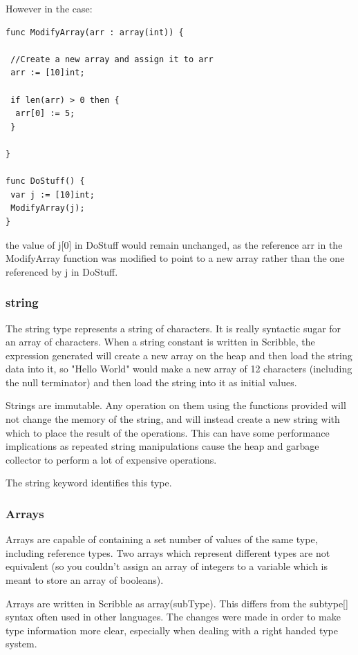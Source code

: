 \documentclass[]{final_report}
\begin{document}
However in the case:
\begin{verbatim}
func ModifyArray(arr : array(int)) {

 //Create a new array and assign it to arr
 arr := [10]int;

 if len(arr) > 0 then {
  arr[0] := 5;
 }

}

func DoStuff() {
 var j := [10]int;
 ModifyArray(j);
}
\end{verbatim}
the value of j[0] in DoStuff would remain unchanged, as the reference arr in the ModifyArray function was modified to point to a new array rather than the one referenced by j in DoStuff.

\subsubsection{string}

The string type represents a string of characters. It is really syntactic sugar for an array of characters. When a string constant is written in Scribble, the expression generated will create a new array on the heap and then load the string data into it, so "Hello World" would make a new array of 12 characters (including the null terminator) and then load the string into it as initial values.

Strings are immutable. Any operation on them using the functions provided will not change the memory of the string, and will instead create a new string with which to place the result of the operations. This can have some performance implications as repeated string manipulations cause the heap and garbage collector to perform a lot of expensive operations.

The string keyword identifies this type.

\subsubsection{Arrays}

Arrays are capable of containing a set number of values of the same type, including reference types. Two arrays which represent different types are not equivalent (so you couldn't assign an array of integers to a variable which is meant to store an array of booleans).

Arrays are written in Scribble as array(subType). This differs from the subtype[] syntax often used in other languages. The changes were made in order to make type information more clear, especially when dealing with a right handed type system.
\end{document}
